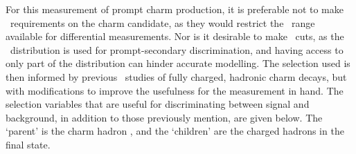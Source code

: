 For this measurement of prompt charm production, it is preferable not to make 
\pT\ requirements on the charm candidate, as they would restrict the \pT\ range 
available for differential measurements.
Nor is it desirable to make \ipchisq\ cuts, as the \ipchisq\ distribution is 
used for prompt-secondary discrimination, and having access to only part of the 
distribution can hinder accurate modelling.
The selection used is then informed by previous \lhcb\ studies of fully 
charged, hadronic charm decays, but with modifications to improve the 
usefulness for the measurement in hand.
The selection variables that are useful for discriminating between signal and 
background, in addition to those previously mention, are given below.
The `parent' is the charm hadron \PHc, and the `children' are the charged 
hadrons in the final state.

